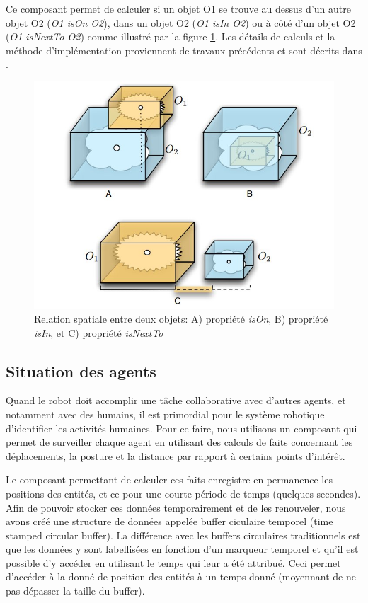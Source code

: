\documentclass[a4paper,11pt,twoside]{StyleThese}
\begin{document}
Ce composant permet de calculer si un objet O1 se trouve au dessus d'un autre objet O2 (\textit{O1 isOn O2}), dans un objet O2 (\textit{O1 isIn O2}) ou à côté d'un objet O2 (\textit{O1 isNextTo O2}) comme illustré par la figure \ref{fig:spar}. Les détails de calculs et la méthode d'implémentation proviennent de travaux précédents et sont décrits dans \cite{sisbot2011situation}.


\begin{figure}[ht!]
 \centering
  \includegraphics[width=0.5\linewidth]{./img/spar.jpg} 
  \caption {Relation spatiale entre deux objets: A) propriété \textit{isOn}, B) propriété \textit{isIn}, et C) propriété \textit{isNextTo}}
  \label{fig:spar}
\end{figure}


\subsection{Situation des agents}
\label{sec:situationAgents}

Quand le robot doit accomplir une tâche collaborative avec d'autres agents, et notamment avec des humains, il est primordial pour le système robotique d'identifier les activités humaines. Pour ce faire, nous utilisons un composant qui permet de surveiller chaque agent en utilisant des calculs de faits concernant les déplacements, la posture et la distance par rapport à certains points d'intérêt.

Le composant permettant de calculer ces faits enregistre en permanence les positions des entités, et ce pour une courte période de temps (quelques secondes). Afin de pouvoir stocker ces données temporairement et de les renouveler, nous avons créé une structure de données appelée buffer ciculaire temporel (time stamped circular buffer). La différence avec les buffers circulaires traditionnels est que les données y sont labellisées en fonction d'un marqueur temporel et qu'il est possible d'y accéder en utilisant le temps qui leur a été attribué. Ceci permet d'accéder à la donné de position des entités à un temps donné (moyennant de ne pas dépasser la taille du buffer).
\end{document}
